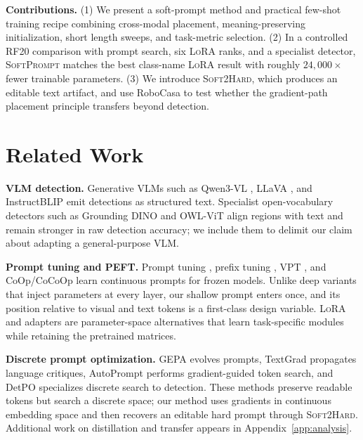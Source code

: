 \documentclass{article}
\newcommand{\ours}{\textsc{SoftPrompt}}
\newcommand{\lora}{\textsc{LoRA}}
\newcommand{\distill}{\textsc{Soft2Hard}}
\newcommand{\qwen}{Qwen3-VL}
\begin{document}
\textbf{Contributions.}
(1) We present a soft-prompt method and practical few-shot training recipe
combining cross-modal placement, meaning-preserving initialization, short
length sweeps, and task-metric selection.
(2) In a controlled RF20 comparison with prompt search, six \lora{} ranks, and
a specialist detector, \ours{} matches the best class-name \lora{} result with
roughly $24{,}000\times$ fewer trainable parameters.
(3) We introduce \distill{}, which produces an editable text artifact, and use
RoboCasa to test whether the gradient-path placement principle transfers
beyond detection.

\section{Related Work}
\label{sec:related}

\textbf{VLM detection.}
Generative VLMs such as \qwen{} \citep{Bai2023Qwen-VL:Beyond}, LLaVA
\citep{Liu2023VisualTuning}, and InstructBLIP \citep{instructblip} emit
detections as structured text.
Specialist open-vocabulary detectors such as Grounding DINO
\citep{Liu2023GroundingDetection} and OWL-ViT \citep{owlvit} align regions with
text and remain stronger in raw detection accuracy; we include them to delimit
our claim about adapting a general-purpose VLM.

\textbf{Prompt tuning and PEFT.}
Prompt tuning \citep{LesterTheTuning}, prefix tuning \citep{li2021prefix},
VPT \citep{jia2022vpt}, and CoOp/CoCoOp
\citep{ZhouLearningModels,cocoop} learn continuous prompts for frozen models.
Unlike deep variants that inject parameters at every layer, our shallow prompt
enters once, and its position relative to visual and text tokens is a
first-class design variable.
\lora{} \citep{Hu2021LoRA:Models} and adapters \citep{adapters} are
parameter-space alternatives that learn task-specific modules while retaining
the pretrained matrices.

\textbf{Discrete prompt optimization.}
GEPA \citep{AgrawalGEPA:LEARNING} evolves prompts, TextGrad
\citep{yuksekgonul2024textgrad} propagates language critiques, AutoPrompt
\citep{Shin2020AutoPrompt:Prompts} performs gradient-guided token search, and
DetPO \citep{Gare2026DetPO:Detection} specializes discrete search to detection.
These methods preserve readable tokens but search a discrete space; our method
uses gradients in continuous embedding space and then recovers an editable
hard prompt through \distill{}.
Additional work on distillation and transfer appears in
Appendix~\ref{app:analysis}.
\end{document}
